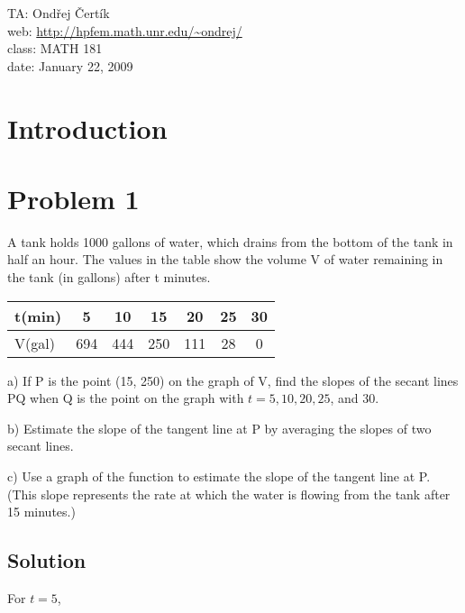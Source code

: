 \documentclass[10pt]{article}
\begin{document}
\noindent TA: Ondřej Čertík\\
web: \url{http://hpfem.math.unr.edu/~ondrej/}\\
class: MATH 181\\
date: January 22, 2009

\section{Introduction}

\section{Problem 1}

A tank holds 1000 gallons of water, which drains from the bottom of the tank in
half an hour. The values in the table show the volume V of water remaining in
the tank (in gallons) after t minutes.

\begin{tabular}{|l||c|c|c|c|c|c|}
\hline
t(min) & 5   & 10  & 15  & 20  & 25 & 30 \\ \hline
V(gal) & 694 & 444 & 250 & 111 & 28 & 0 \\
\hline
\end{tabular}

a) If P is the point (15, 250) on the graph of V, find the
slopes of the secant lines PQ when Q is the point on the
graph with $t = 5, 10, 20, 25$, and 30.

b) Estimate the slope of the tangent line at P by averaging
the slopes of two secant lines.

c) Use a graph of the function to estimate the slope of the tangent line at P.
(This slope represents the rate at which the water is flowing from the tank
after 15 minutes.)

\subsection*{Solution}

For $t=5$, 
\end{document}
